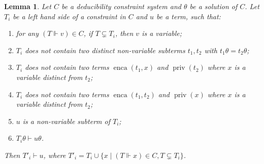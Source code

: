 \documentclass[acmtocl,acmnow]{acmtrans2m}
\newtheorem{lemma}[theorem]{Lemma}
\newcommand{\set}[1]{\lbrace{#1}\rbrace}
\newcommand{\enca}{\operatorname{enca}}
\newcommand{\priv}{\operatorname{priv}}
\newcommand{\dedsys}[1]{deducibility constraint system}
\begin{document}
\begin{lemma}\label{lemma_R1}
Let $C$ be a \dedsys{} and $\theta$ be a solution of $C$. 
Let $T_i$
be a left hand side of a constraint in $C$ and $u$ be a term, such that:
\begin{enumerate}
\item \label{hyp1} for any $(T\Vdash v)\in C$,
if $T\subsetneq T_i$, then $v$ is a variable;
\item \label{hyp2}
 $T_i$ does not contain two distinct non-variable subterms $t_1, t_2$ with
$t_1\theta=t_2\theta$;

\item \label{hyp3} $T_i$ does not contain two terms $\enca(t_1,x)$ and $\priv(t_2)$ where
$x$ is a variable distinct from $t_2$;
\item \label{hyp3b} $T_i$ does not contain two terms $\enca(t_1,t_2)$ and $\priv(x)$ where $x$ is a variable distinct from $t_2$;
\item \label{hyp4} $u$ is a non-variable subterm of $T_i$;
\item \label{hyp5} $T_i\theta \vdash u\theta$.
\end{enumerate}
Then 
 $T'_i\vdash u$, where $T'_i=T_i\cup\set{x\mid (T\Vdash x)\in C, T\subsetneq T_i}$.
\end{lemma}
\end{document}

